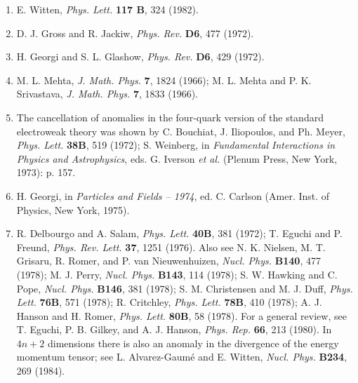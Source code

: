 \begin{enumerate}
\item[10b.] \label{ch22-ref-10b}
E. Witten, \emph{Phys. Lett.} \textbf{117 B}, 324 (1982).

\item {}\label{ch22-ref-11}
D. J. Gross and R. Jackiw, \emph{Phys. Rev.} \textbf{D6}, 477 (1972).

\item {}\label{ch22-ref-12}
H. Georgi and S. L. Glashow, \emph{Phys. Rev.} \textbf{D6}, 429 (1972).

\item {}\label{ch22-ref-13}
M. L. Mehta, \emph{J. Math. Phys.} \textbf{7}, 1824 (1966);
M. L. Mehta and P. K. Srivastava, \emph{J. Math. Phys.} \textbf{7},
1833 (1966).

\item[13a.] \label{ch22-ref-13a}
The cancellation of anomalies in the four-quark version of the standard
electroweak theory was shown by C. Bouchiat, J. Iliopoulos, and Ph. Meyer,
\emph{Phys. Lett.} \textbf{38B}, 519 (1972); S. Weinberg, in
\emph{Fundamental Interactions in Physics and Astrophysics}, eds.
G. Iverson \emph{et al.} (Plenum Press, New York, 1973): p. 157.

\item {}\label{ch22-ref-14}
H. Georgi, in \emph{Particles and Fields -- 1974}, ed. C. Carlson
(Amer. Inst. of Physics, New York, 1975).

\item {}\label{ch22-ref-15}
R. Delbourgo and A. Salam, \emph{Phys. Lett.} \textbf{40B}, 381 (1972);
T. Eguchi and P. Freund, \emph{Phys. Rev. Lett.} \textbf{37}, 1251
(1976). Also see N. K. Nielsen, M. T. Grisaru, R. Romer, and
P. van Nieuwenhuizen, \emph{Nucl. Phys.} \textbf{B140}, 477 (1978);
M. J. Perry, \emph{Nucl. Phys.} \textbf{B143}, 114 (1978);
S. W. Hawking and C. Pope, \emph{Nucl. Phys.} \textbf{B146}, 381 (1978);
S. M. Christensen and M. J. Duff, \emph{Phys. Lett.} \textbf{76B}, 571
(1978); R. Critchley, \emph{Phys. Lett.} \textbf{78B}, 410 (1978);
A. J. Hanson and H. Romer, \emph{Phys. Lett.} \textbf{80B}, 58 (1978).
For a general review, see T. Eguchi, P. B. Gilkey, and A. J. Hanson,
\emph{Phys. Rep.} \textbf{66}, 213 (1980). In $4n+2$ dimensions there is
also an anomaly in the divergence of the energy momentum tensor; see
L. Alvarez-Gaum\'e and E. Witten, \emph{Nucl. Phys.} \textbf{B234}, 269
(1984).


\end{enumerate}
